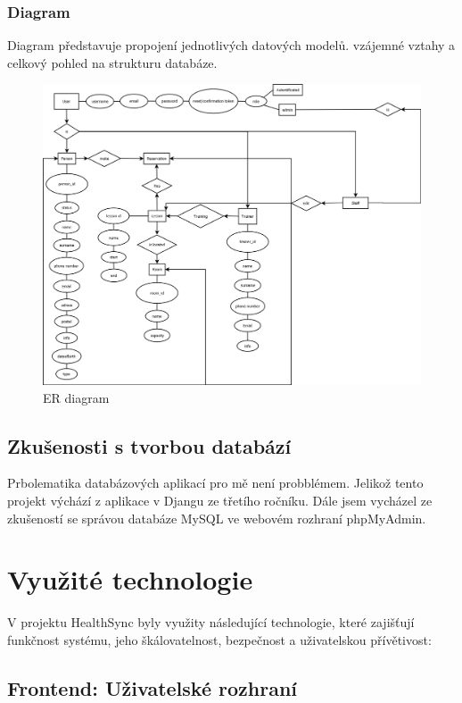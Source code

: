 \documentclass[12pt, a4paper,
openright
]{report}
\begin{document}
\subsection{Diagram}
Diagram představuje propojení jednotlivých datových modelů. vzájemné vztahy a celkový pohled na strukturu databáze.
\begin{figure}[h]
			\centering
			\includegraphics[width=1\linewidth]{image/Diagram.png} 
            \caption{ER diagram}
		\end{figure}

\section{Zkušenosti s tvorbou databází}
\label{sec:zkusenosti}

Prbolematika databázových aplikací pro mě není probblémem. Jelikož tento projekt výchází z aplikace v Djangu ze třetího ročníku. Dále jsem vycházel ze zkušeností se správou databáze MySQL ve webovém rozhraní phpMyAdmin.

	\chapter{Využité technologie}
	V projektu HealthSync byly využity následující technologie, které zajišťují funkčnost systému, jeho škálovatelnost, bezpečnost a uživatelskou přívětivost:
	
	
	\section{Frontend: Uživatelské rozhraní} 
    
\end{document}
